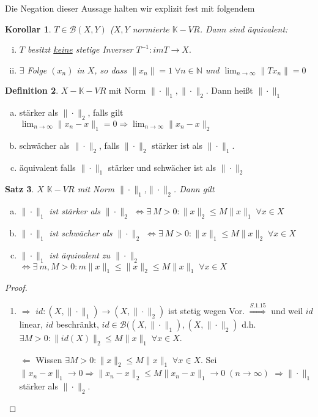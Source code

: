 \documentclass[ngerman]{report}
\theoremstyle{plain}%
\newtheorem{thm}{Satz}[chapter]
\newtheorem{cor}[thm]{Korollar}
\theoremstyle{definition}%
\newtheorem{definition}[thm]{Definition}
\theoremstyle{myStyle}
\newcommand{\N}{\mathbb{N}}
\newcommand{\K}{\mathbb{K}}
\newcommand{\B}{\mathcal{B}} %
\newcommand{\BS}[1][X,Y]{\mathcal{B}(#1)} %
\newcommand{\norm}[1]{\|#1\|}
\newcommand{\df}[1][]{%
	\overset{#1}{\Rightarrow}
}
\newcommand{\aq}{\Leftrightarrow} %
\newcommand{\limes}[1][\infty]{\lim_{n \to #1}}
\newcommand{\inv}[1]{#1^{-1}}
\newcommand{\disp}{\displaystyle}
\newcommand{\qmarks}[1]{#1}
\begin{document}
Die Negation dieser Aussage halten wir explizit fest mit folgendem 
	\begin{cor}
		$T \in \BS$ ($X,Y$ normierte $\K-VR$. Dann sind äquivalent:
			\begin{enumerate}[(i)]
				\item $T$ besitzt \underline{keine} stetige Inverser 
					$\inv{T} : imT\to X.$
				\item $\exists$ Folge $(x_n)$ in $X$, so dass $\norm{x_n} = 1 \; \forall n\in \N$
					und $\disp \limes \norm{T x_n} = 0$
			\end{enumerate}
	\end{cor}

	\begin{definition}
		$X-\K-VR$ mit Norm $\norm{\cdot}_1,\norm{\cdot}_2$. Dann heißt $\norm{\cdot}_1$ 
			\begin{enumerate}[(a)]
				\item \qmarks{stärker} als $\norm{\cdot}_2$, falls gilt
					$\disp \limes \norm{x_n - x}_1 = 0 \df \limes \norm{x_n - x}_2$
				\item \qmarks{schwächer} als $\norm{\cdot}_2$, falls $\norm{\cdot}_2$ stärker ist als $\norm{\cdot}_1$.
				\item \qmarks{äquivalent} falls $\norm{\cdot}_1$ stärker und schwächer ist als $\norm{\cdot}_2$
			\end{enumerate}
	\end{definition}

	\begin{thm}
		$X$ $\K-VR$ mit Norm $\norm{\cdot}_1$,$\norm{\cdot}_2$. Dann gilt 
			\begin{enumerate}[(a)]
				\item $\norm{\cdot}_1$ ist stärker als $\norm{\cdot}_2$ 
					$\aq \exists \: M > 0: \norm{x}_2 \leq M \norm{x}_1 \; \forall x\in X$
				\item $\norm{\cdot}_1$ ist schwächer als $\norm{\cdot}_2$ 
					$\aq \exists \: M > 0: \norm{x}_1 \leq M \norm{x}_2 \; \forall x\in X$
				\item $\norm{\cdot}_1$ ist äquivalent zu $\norm{\cdot}_2$ 
					$\aq \exists \: m,M > 0: m\norm{x}_1 \leq \norm{x}_2 \leq M \norm{x}_1 \; \forall x\in X$
			\end{enumerate}
	\end{thm}

	\begin{proof}
		\begin{enumerate}[zu (a):]
	 		\item \qmarks{$\df$} $id : (X,\norm{\cdot}_1) \to (X,\norm{\cdot}_2)$ ist stetig wegen Vor.
				$\df[S.1.15]$ und weil $id$ linear, $id$ beschränkt, 
				$id\in \B((X,\norm{\cdot}_1), (X,\norm{\cdot}_2)$ d.h. 
				$\exists M > 0: \norm{id(X)}_2 \leq M \norm{x}_1 \; \forall x\in X$.\par
			\qmarks{$\Leftarrow$}	Wissen $\exists M>0: \norm{x}_2 \leq M\norm{x}_1 \; \forall x\in X$.
			Sei $\norm{x_n - x}_1 \to 0 \df \norm{x_n - x}_2 \leq M\norm{x_n - x}_1 \to 0 \; (n\to\infty)$
			$\df \norm{\cdot}_1$ stärker als $\norm{\cdot}_2$.
	 	\end{enumerate}
	\end{proof}
\end{document}
